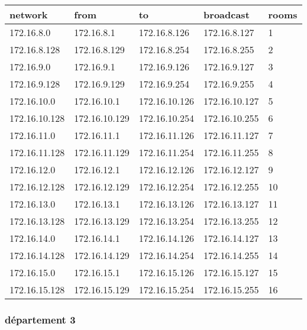 \documentclass[11pt]{article}
\begin{document}
\begin{center}
\begin{tabular}{|l|l|l|l|l|}
\hline
network & from & to & broadcast & rooms \\
\hline
172.16.8.0 & 172.16.8.1 & 172.16.8.126 & 172.16.8.127 & 1 \\
\hline
172.16.8.128 & 172.16.8.129 & 172.16.8.254 & 172.16.8.255 & 2 \\
\hline
172.16.9.0 & 172.16.9.1 & 172.16.9.126 & 172.16.9.127 & 3 \\
\hline
172.16.9.128 & 172.16.9.129 & 172.16.9.254 & 172.16.9.255 & 4 \\
\hline
172.16.10.0 & 172.16.10.1 & 172.16.10.126 & 172.16.10.127 & 5 \\
\hline
172.16.10.128 & 172.16.10.129 & 172.16.10.254 & 172.16.10.255 & 6 \\
\hline
172.16.11.0 & 172.16.11.1 & 172.16.11.126 & 172.16.11.127 & 7 \\
\hline
172.16.11.128 & 172.16.11.129 & 172.16.11.254 & 172.16.11.255 & 8 \\
\hline
172.16.12.0 & 172.16.12.1 & 172.16.12.126 & 172.16.12.127 & 9 \\
\hline
172.16.12.128 & 172.16.12.129 & 172.16.12.254 & 172.16.12.255 & 10 \\
\hline
172.16.13.0 & 172.16.13.1 & 172.16.13.126 & 172.16.13.127 & 11 \\
\hline
172.16.13.128 & 172.16.13.129 & 172.16.13.254 & 172.16.13.255 & 12 \\
\hline
172.16.14.0 & 172.16.14.1 & 172.16.14.126 & 172.16.14.127 & 13 \\
\hline
172.16.14.128 & 172.16.14.129 & 172.16.14.254 & 172.16.14.255 & 14 \\
\hline
172.16.15.0 & 172.16.15.1 & 172.16.15.126 & 172.16.15.127 & 15 \\
\hline
172.16.15.128 & 172.16.15.129 & 172.16.15.254 & 172.16.15.255 & 16 \\
\hline
\end{tabular}
\end{center}

\subsubsection{département 3}
\label{sec:orgheadline7}
\end{document}
